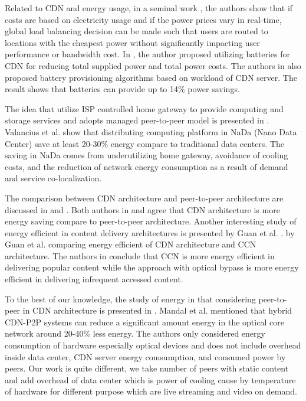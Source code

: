 Related to CDN and energy usage, in a seminal work \cite{qureshi2009cutting}, the authors show that if costs are based on electricity usage and if the power prices vary in real-time, global load balancing decision can be made such that users are routed to locations with the cheapest power without significantly impacting user performance or bandwidth cost.  
In \cite{Palasamudram:2012:UBR:2391229.2391240}, the author proposed utilizing batteries for CDN for reducing total supplied power and total power costs.
The authors in \cite{Palasamudram:2012:UBR:2391229.2391240} also proposed battery provisioning algorithms based on workload of CDN server. 
The result shows that batteries can provide up to 14\% power savings.

The idea that utilize ISP controlled home gateway to provide computing and storage services and adopts managed peer-to-peer model is presented in \cite{valancius2009greening}. 
Valancius et al. \cite{valancius2009greening} show that distributing computing platform in NaDa (Nano Data Center) save at least 20-30\% energy compare to traditional data centers.
The saving in NaDa comes from underutilizing home gateway, avoidance of cooling costs, and the reduction of network energy consumption as a result of demand and service co-localization.

The comparison between CDN architecture and peer-to-peer architecture are discussed in \cite{baliga2007energy} and \cite{feldmann2010energy}.
Both authors in \cite{baliga2007energy} and \cite{feldmann2010energy} agree that CDN architecture is more energy saving compare to peer-to-peer architecture. 
Another interesting study of energy efficient in content delivery architectures is presented by Guan et al. \cite{5963557}.
by Guan et al. \cite{5963557} comparing energy efficient of CDN architecture and CCN architecture.
The authors in \cite{5963557} conclude that CCN is more energy efficient in delivering popular content while the approach with optical bypass is more energy efficient in delivering infrequent accessed content.

To the best of our knowledge, the study of energy in that considering peer-to-peer in CDN architecture is presented in \cite{6524219}.
Mandal et al. \cite{6524219} mentioned that hybrid CDN-P2P systems can reduce a significant amount energy in the optical core network around 20-40\% less energy.  
The authors only considered energy consumption of hardware especially optical devices and does not include overhead inside data center, CDN server energy comsumption, and consumed power by peers.
Our work is quite different, we take number of peers with static content and add overhead of data center which is  power of cooling cause by temperature of hardware for different purpose which are live streaming and video on demand.



